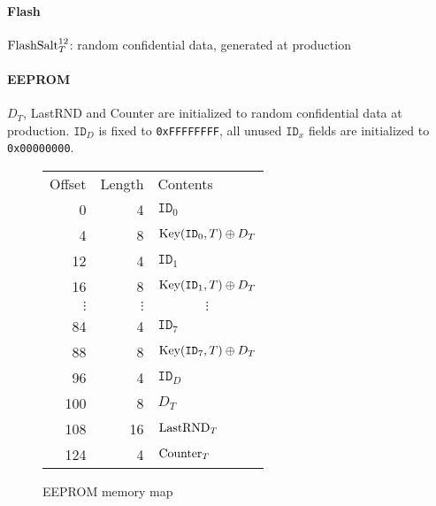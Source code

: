 \documentclass[a4paper,10pt]{scrartcl}
\begin{document}
\paragraph{Flash} $\textnormal{FlashSalt}_T^{12}$: random confidential data, generated at production
\paragraph{EEPROM} $D_T$, LastRND and Counter are initialized to random confidential data at production. $\texttt{ID}_D$ is fixed to \verb|0xFFFFFFFF|, all unused $\texttt{ID}_x$ fields are initialized to \verb|0x00000000|.

\begin{figure}[h]
  \centering \caption{EEPROM memory map}
  \begin{tabular}{rr|l|}
    \multicolumn{1}{r}{Offset} & \multicolumn{1}{r}{Length} & \multicolumn{1}{l}{Contents} \\\cline{3-3}
    0 & 4 & $\texttt{ID}_0$ \\\cline{3-3}
    4 & 8 & $\textnormal{Key}(\texttt{ID}_0,T) \oplus D_T$ \\\cline{3-3}
   12 & 4 & $\texttt{ID}_1$ \\\cline{3-3}
   16 & 8 & $\textnormal{Key}(\texttt{ID}_1,T) \oplus D_T$ \\\cline{3-3}
   $\vdots$ & $\vdots$ & \multicolumn{1}{|c|}{$\vdots$} \\\cline{3-3}
   84 & 4 & $\texttt{ID}_7$ \\\cline{3-3}
   88 & 8 & $\textnormal{Key}(\texttt{ID}_7,T) \oplus D_T$ \\\cline{3-3}
   96 & 4 & $\texttt{ID}_D$ \\\cline{3-3}
  100 & 8 & $D_T$ \\\cline{3-3}
  108 & 16 & $\textnormal{LastRND}_T$ \\\cline{3-3}
  124 & 4 & $\textnormal{Counter}_T$ \\\cline{3-3}
  \end{tabular}
\end{figure}
\end{document}
